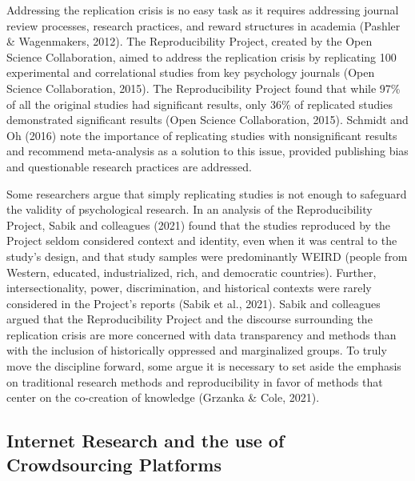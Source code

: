 \documentclass[
  11pt,
]{book}
\begin{document}
Addressing the replication crisis is no easy task as it requires addressing journal review processes, research practices, and reward structures in academia (Pashler \& Wagenmakers, 2012). The Reproducibility Project, created by the Open Science Collaboration, aimed to address the replication crisis by replicating 100 experimental and correlational studies from key psychology journals (Open Science Collaboration, 2015). The Reproducibility Project found that while 97\% of all the original studies had significant results, only 36\% of replicated studies demonstrated significant results (Open Science Collaboration, 2015). Schmidt and Oh (2016) note the importance of replicating studies with nonsignificant results and recommend meta-analysis as a solution to this issue, provided publishing bias and questionable research practices are addressed.

Some researchers argue that simply replicating studies is not enough to safeguard the validity of psychological research. In an analysis of the Reproducibility Project, Sabik and colleagues (2021) found that the studies reproduced by the Project seldom considered context and identity, even when it was central to the study's design, and that study samples were predominantly WEIRD (people from Western, educated, industrialized, rich, and democratic countries). Further, intersectionality, power, discrimination, and historical contexts were rarely considered in the Project's reports (Sabik et al., 2021). Sabik and colleagues argued that the Reproducibility Project and the discourse surrounding the replication crisis are more concerned with data transparency and methods than with the inclusion of historically oppressed and marginalized groups. To truly move the discipline forward, some argue it is necessary to set aside the emphasis on traditional research methods and reproducibility in favor of methods that center on the co-creation of knowledge (Grzanka \& Cole, 2021).

\subsection{Internet Research and the use of Crowdsourcing Platforms}\label{internet-research-and-the-use-of-crowdsourcing-platforms}
\end{document}
